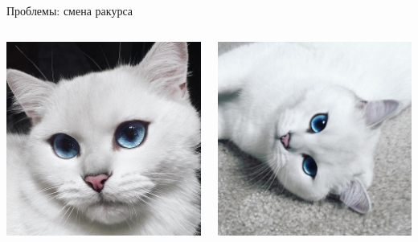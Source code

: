 \documentclass[aspectratio=169, professionalfonts]{beamer}
\begin{document}
\begin{frame}{Проблемы: смена ракурса}
    \begin{columns}
        \begin{column}{.325\linewidth}
            \centering
            \includegraphics[width=\linewidth]{graphs/fig11_1.jpg}
        \end{column}
        \begin{column}{.325\linewidth}
            \centering
            \includegraphics[width=\linewidth]{graphs/fig11_2.jpg}

\end{column}
\end{columns}
\end{frame}
\end{document}
